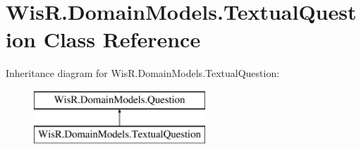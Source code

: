 \hypertarget{class_wis_r_1_1_domain_models_1_1_textual_question}{}\section{Wis\+R.\+Domain\+Models.\+Textual\+Question Class Reference}
\label{class_wis_r_1_1_domain_models_1_1_textual_question}
Inheritance diagram for Wis\+R.\+Domain\+Models.\+Textual\+Question\+:\begin{figure}[H]
\begin{center}
\leavevmode
\includegraphics[height=2.000000cm]{class_wis_r_1_1_domain_models_1_1_textual_question}
\end{center}
\end{figure}
